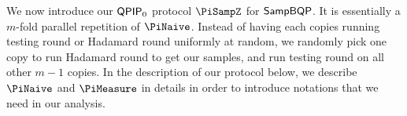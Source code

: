 \iffalse
The following protocol is a $\QPIP_0$ protocol for $\SampBQP$

$\forall c\in\bbN$ Soundness = $O(T^{-c})$

Given inverse poly p(T), we can parameterize the protocol to have soundness p(T)
\fi


We now introduce our $\QPIP_0$ protocol $\PiSampZ$ for $\SampBQP$.
It is essentially a $m$-fold parallel repetition of $\PiNaive$.
Instead of having each copies running testing round or Hadamard round uniformly at random, we randomly pick one copy to run Hadamard round to get our samples, and run testing round on all other $m-1$ copies.
In the description of our protocol below, we describe $\PiNaive$ and $\PiMeasure$ in details  in order to introduce notations that we need in our analysis.

